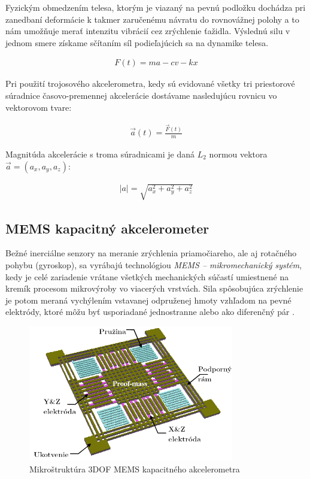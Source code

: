 Fyzickým obmedzením  telesa, ktorým je viazaný na pevnú podložku dochádza pri zanedbaní deformácie k takmer zaručenému návratu do rovnovážnej polohy a to nám umožňuje merať intenzitu vibrácií cez zrýchlenie ťažidla. Výslednú silu v jednom smere získame sčítaním síl podieľajúcich sa na dynamike telesa.
\begin{ceqn}\begin{align}
 	F(t) = ma - cv - kx
\end{align}\end{ceqn}
Pri použití trojosového akcelerometra, kedy sú evidované všetky tri priestorové súradnice časovo-premennej akcelerácie dostávame
nasledujúcu rovnicu vo vektorovom tvare:
\begin{ceqn}\begin{align}
   \vec{a}(t) = \frac{\vec{F}(t)}{m}
\end{align}\end{ceqn}
Magnitúda akcelerácie s troma súradnicami je daná $L_2$ normou vektora $\vec{a} = (a_x, a_y, a_z)$:
\begin{ceqn}\begin{align}
   |a| = \sqrt{a_x^2 + a_y^2 + a_z^2}
\end{align}\end{ceqn}

\subsection{MEMS kapacitný akcelerometer}
Bežné inerciálne senzory na meranie zrýchlenia priamočiareho, ale aj rotačného pohybu (gyroskop), sa vyrábajú technológiou
\emph{MEMS – mikromechanický systém}, kedy je celé zariadenie vrátane všetkých mechanických súčastí umiestnené na kremík procesom
mikrovýroby vo viacerých vrstvách. Sila spôsobujúca zrýchlenie je potom meraná vychýlením vstavanej odpruženej hmoty vzhľadom
na pevné elektródy, ktoré môžu byť usporiadané jednostranne alebo ako diferenčný pár \cite{mdof-mems-accelerometers}.

\begin{figure}[h]
	\centering
	\includegraphics[width=0.8\textwidth]{figures/mems-accelerometer.png}
	\caption{Mikroštruktúra 3DOF MEMS kapacitného akcelerometra \cite{microstructure-mems}}
	\label{fig:mems}
\end{figure}

